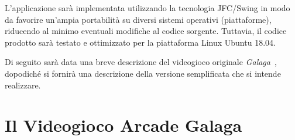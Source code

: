 \documentclass[12pt,a4paper]{report}
\begin{document}
L'applicazione sarà implementata utilizzando la tecnologia JFC/Swing in modo da favorire un'ampia portabilità su diversi sistemi operativi (piattaforme), riducendo al minimo eventuali modifiche al codice sorgente. Tuttavia, il codice prodotto sarà testato e ottimizzato per la piattaforma Linux Ubuntu 18.04.

\medskip
Di seguito sarà data una breve descrizione del videogioco originale \emph{Galaga}~\cite{wiki:it:galaga,wiki:en:galaga}, dopodiché si fornirà una descrizione della versione semplificata che si intende realizzare.

\section{Il Videogioco Arcade Galaga}\label{se:gal}
\lipsum[1-2]
\end{document}
